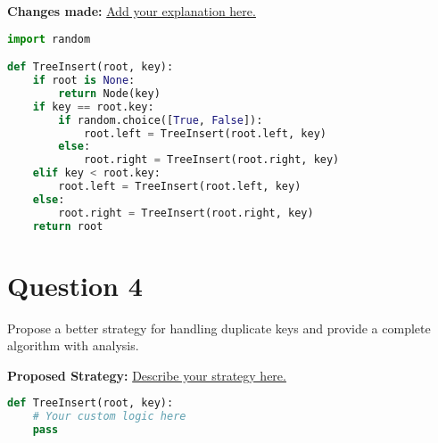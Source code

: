 \documentclass[12pt]{article}
\begin{document}
\vspace{1em} %
\textbf{Changes made:} \underline{Add your explanation here.}

\begin{lstlisting}[language=Python, caption={TreeInsert with Randomized Insertion}]
import random

def TreeInsert(root, key):
    if root is None:
        return Node(key)
    if key == root.key:
        if random.choice([True, False]):
            root.left = TreeInsert(root.left, key)
        else:
            root.right = TreeInsert(root.right, key)
    elif key < root.key:
        root.left = TreeInsert(root.left, key)
    else:
        root.right = TreeInsert(root.right, key)
    return root
\end{lstlisting}

\pagebreak

\section*{Question 4}
Propose a better strategy for handling duplicate keys and provide a complete algorithm with analysis.

\vspace{1em} %
\textbf{Proposed Strategy:} \underline{Describe your strategy here.}

\begin{lstlisting}[language=Python, caption={Proposed TreeInsert Algorithm}]
def TreeInsert(root, key):
    # Your custom logic here
    pass
\end{lstlisting}
\end{document}
